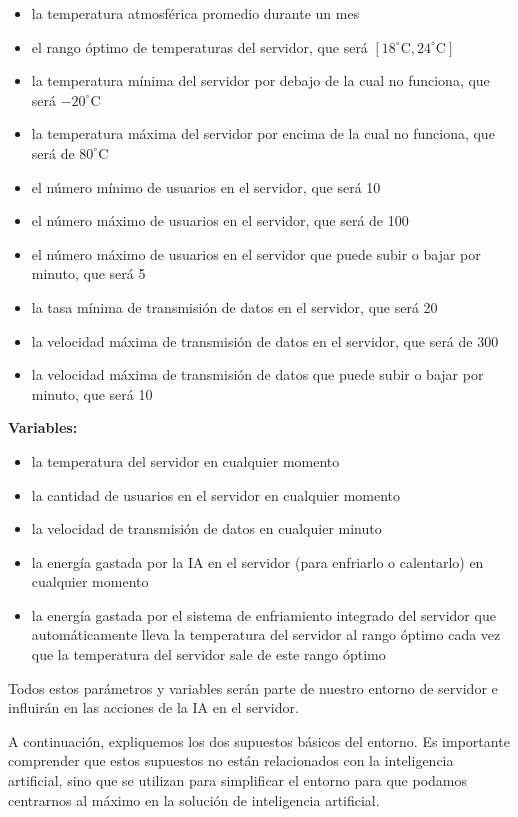 \documentclass[
]{book}
\providecommand{\tightlist}{%
  \setlength{\itemsep}{0pt}\setlength{\parskip}{0pt}}
\begin{document}
\begin{itemize}
\tightlist
\item
  la temperatura atmosférica promedio durante un mes
\item
  el rango óptimo de temperaturas del servidor, que será \([18^{\circ} \textrm{C}, 24^{\circ} \textrm{C}]\)
\item
  la temperatura mínima del servidor por debajo de la cual no funciona, que será \(-20^{\circ} \textrm {C}\)
\item
  la temperatura máxima del servidor por encima de la cual no funciona, que será de \(80^{\circ} \textrm {C}\)
\item
  el número mínimo de usuarios en el servidor, que será 10
\item
  el número máximo de usuarios en el servidor, que será de 100
\item
  el número máximo de usuarios en el servidor que puede subir o bajar por minuto, que será 5
\item
  la tasa mínima de transmisión de datos en el servidor, que será 20
\item
  la velocidad máxima de transmisión de datos en el servidor, que será de 300
\item
  la velocidad máxima de transmisión de datos que puede subir o bajar por minuto, que será 10
\end{itemize}

\textbf{Variables:}

\begin{itemize}
\tightlist
\item
  la temperatura del servidor en cualquier momento
\item
  la cantidad de usuarios en el servidor en cualquier momento
\item
  la velocidad de transmisión de datos en cualquier minuto
\item
  la energía gastada por la IA en el servidor (para enfriarlo o calentarlo) en cualquier momento
\item
  la energía gastada por el sistema de enfriamiento integrado del servidor que automáticamente lleva la temperatura del servidor al rango óptimo cada vez que la temperatura del servidor sale de este rango óptimo
\end{itemize}

Todos estos parámetros y variables serán parte de nuestro entorno de servidor e influirán en las acciones de la IA en el servidor.

A continuación, expliquemos los dos supuestos básicos del entorno. Es importante comprender que estos supuestos no están relacionados con la inteligencia artificial, sino que se utilizan para simplificar el entorno para que podamos centrarnos al máximo en la solución de inteligencia artificial.
\end{document}
